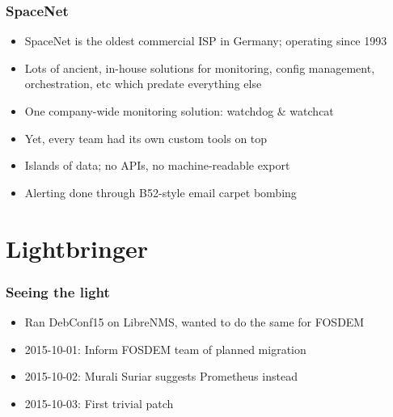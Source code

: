\documentclass[t]{beamer}
\begin{document}
\begin{frame}
	\frametitle{SpaceNet}
	\begin{itemize}
		\item SpaceNet is the oldest commercial ISP in Germany; operating since 1993
		\item Lots of ancient, in-house solutions for monitoring, config management, orchestration, etc which predate everything else
		\item One company-wide monitoring solution: watchdog \& watchcat
		\item Yet, every team had its own custom tools on top
		\item Islands of data; no APIs, no machine-readable export
		\item Alerting done through B52-style email carpet bombing
	\end{itemize}
\end{frame}

\section{Lightbringer}

\begin{frame}
	\frametitle{Seeing the light}
	\begin{itemize}
		\item Ran DebConf15 on LibreNMS, wanted to do the same for FOSDEM
		\item 2015-10-01: Inform FOSDEM team of planned migration
		\item 2015-10-02: Murali Suriar suggests Prometheus instead
		\item 2015-10-03: First trivial patch
	\end{itemize}
\end{frame}
\end{document}
